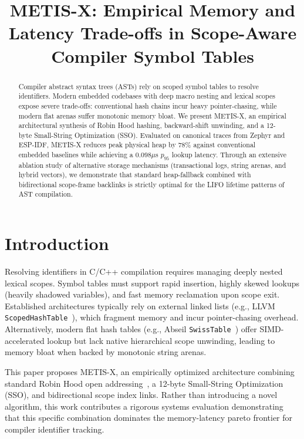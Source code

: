 \documentclass[sigconf]{acmart}
\begin{document}
\title{METIS-X: Empirical Memory and Latency Trade-offs in Scope-Aware Compiler Symbol Tables}

\begin{abstract}
Compiler abstract syntax trees (ASTs) rely on scoped symbol tables to resolve identifiers. Modern embedded codebases with deep macro nesting and lexical scopes expose severe trade-offs: conventional hash chains incur heavy pointer-chasing, while modern flat arenas suffer monotonic memory bloat. We present METIS-X, an empirical architectural synthesis of Robin Hood hashing, backward-shift unwinding, and a 12-byte Small-String Optimization (SSO). Evaluated on canonical traces from Zephyr and ESP-IDF, METIS-X reduces peak physical heap by 78\% against conventional embedded baselines while achieving a $0.098\mu$s $p_{95}$ lookup latency. Through an extensive ablation study of alternative storage mechanisms (transactional logs, string arenas, and hybrid vectors), we demonstrate that standard heap-fallback combined with bidirectional scope-frame backlinks is strictly optimal for the LIFO lifetime patterns of AST compilation.
\end{abstract}

\maketitle

\section{Introduction}
Resolving identifiers in C/C++ compilation requires managing deeply nested lexical scopes. Symbol tables must support rapid insertion, highly skewed lookups (heavily shadowed variables), and fast memory reclamation upon scope exit. Established architectures typically rely on external linked lists (e.g., LLVM \texttt{ScopedHashTable}~\cite{llvm_scopedhashtable}), which fragment memory and incur pointer-chasing overhead. Alternatively, modern flat hash tables (e.g., Abseil \texttt{SwissTable}~\cite{abseil_swisstable}) offer SIMD-accelerated lookup but lack native hierarchical scope unwinding, leading to memory bloat when backed by monotonic string arenas.

This paper proposes METIS-X, an empirically optimized architecture combining standard Robin Hood open addressing~\cite{celis1986robin}, a 12-byte Small-String Optimization (SSO), and bidirectional scope index links. Rather than introducing a novel algorithm, this work contributes a rigorous systems evaluation demonstrating that this specific combination dominates the memory-latency pareto frontier for compiler identifier tracking.
\end{document}
